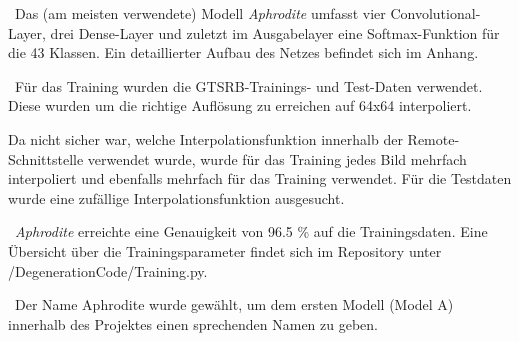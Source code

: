 ~\newline Das (am meisten verwendete) Modell \textit{Aphrodite} umfasst vier Convolutional-Layer, drei Dense-Layer und zuletzt im Ausgabelayer eine Softmax-Funktion für die 43 Klassen. Ein detaillierter Aufbau des Netzes befindet sich im Anhang.

~\newline Für das Training wurden die GTSRB-Trainings- und Test-Daten verwendet. Diese wurden um die richtige Auflösung zu erreichen auf 64x64 interpoliert. 

Da nicht sicher war, welche Interpolationsfunktion innerhalb der Remote-Schnittstelle verwendet wurde, wurde für das Training jedes Bild mehrfach interpoliert und ebenfalls mehrfach für das Training verwendet. Für die Testdaten wurde eine zufällige Interpolationsfunktion ausgesucht. 

~\newline \textit{Aphrodite} erreichte eine Genauigkeit von 96.5 \% auf die Trainingsdaten. Eine Übersicht über die Trainingsparameter findet sich im Repository unter /DegenerationCode/Training.py. 

~\newline Der Name Aphrodite wurde gewählt, um dem ersten Modell (Model A) innerhalb des Projektes einen sprechenden Namen zu geben.

